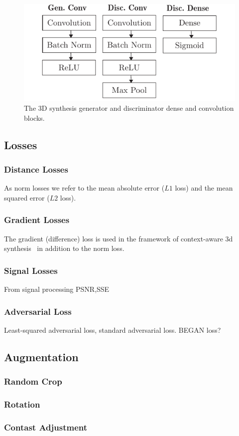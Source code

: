 \begin{figure}[h]
  \centering
  \includegraphics[width=\linewidth]{figure/synthesis-blocks.pdf}
  \caption{The 3D synthesis generator and discriminator dense and convolution
    blocks.
	}\label{fig:synthesis:blocks}
\end{figure}

\subsection{Losses}

\subsubsection{Distance Losses}

As norm losses we refer to the mean absolute error ($L1$ loss) and the
mean squared error ($L2$ loss).

\subsubsection{Gradient Losses}

The gradient (difference) loss is used in the framework of context-aware
3d synthesis~\cite{Nie16} in addition to the norm loss.

\subsubsection{Signal Losses}

From signal processing PSNR,SSE

\subsubsection{Adversarial Loss}

Least-squared adversarial loss, standard adversarial loss. BEGAN loss?


\subsection{Augmentation}

\subsubsection{Random Crop}
\subsubsection{Rotation}
\subsubsection{Contast Adjustment}

